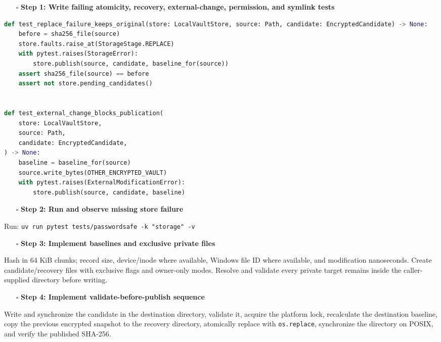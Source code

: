 \documentclass[
  letterpaper,
]{article}
\newcommand{\passthrough}[1]{#1}
\providecommand{\tightlist}{%
  \setlength{\itemsep}{0pt}\setlength{\parskip}{0pt}}
\begin{document}
\begin{itemize}
\tightlist
\item[$\square$]
  \textbf{Step 1: Write failing atomicity, recovery, external-change, permission, and symlink tests}
\end{itemize}

\begin{lstlisting}[language=Python]
def test_replace_failure_keeps_original(store: LocalVaultStore, source: Path, candidate: EncryptedCandidate) -> None:
    before = sha256_file(source)
    store.faults.raise_at(StorageStage.REPLACE)
    with pytest.raises(StorageError):
        store.publish(source, candidate, baseline_for(source))
    assert sha256_file(source) == before
    assert not store.pending_candidates()


def test_external_change_blocks_publication(
    store: LocalVaultStore,
    source: Path,
    candidate: EncryptedCandidate,
) -> None:
    baseline = baseline_for(source)
    source.write_bytes(OTHER_ENCRYPTED_VAULT)
    with pytest.raises(ExternalModificationError):
        store.publish(source, candidate, baseline)
\end{lstlisting}

\begin{itemize}
\tightlist
\item[$\square$]
  \textbf{Step 2: Run and observe missing store failure}
\end{itemize}

Run: \passthrough{\lstinline!uv run pytest tests/passwordsafe -k "storage" -v!}

\begin{itemize}
\tightlist
\item[$\square$]
  \textbf{Step 3: Implement baselines and exclusive private files}
\end{itemize}

Hash in 64 KiB chunks; record size, device/inode where available, Windows file ID where available, and modification
nanoseconds. Create candidate/recovery files with exclusive flags and owner-only modes. Resolve and validate every
private target remains inside the caller-supplied directory before writing.

\begin{itemize}
\tightlist
\item[$\square$]
  \textbf{Step 4: Implement validate-before-publish sequence}
\end{itemize}

Write and synchronize the candidate in the destination directory, validate it, acquire the platform lock, recalculate
the destination baseline, copy the previous encrypted snapshot to the recovery directory, atomically replace with
\nolinkurl{os.replace}, synchronize the directory on POSIX, and verify the published SHA-256.
\end{document}

